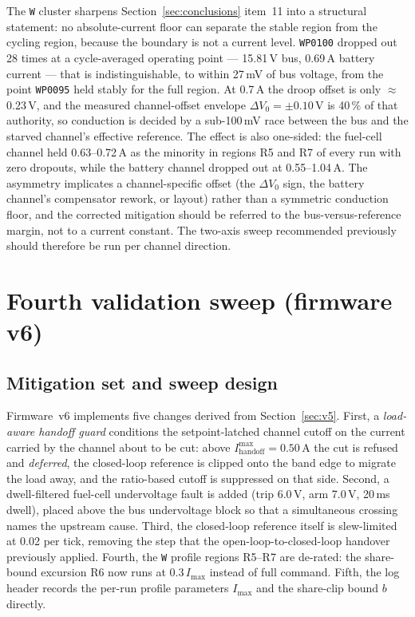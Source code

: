 \documentclass[11pt]{article}
\newcommand{\code}[1]{\texttt{#1}}
\begin{document}
The \code{W} cluster sharpens Section~\ref{sec:conclusions} item~11 into a
structural statement: no absolute-current floor can separate the stable region
from the cycling region, because the boundary is not a current level.
\code{WP0100} dropped out 28 times at a cycle-averaged operating point ---
15.81\,V bus, 0.69\,A battery current --- that is indistinguishable, to within
27\,mV of bus voltage, from the point \code{WP0095} held stably for the full
region. At 0.7\,A the droop offset is only $\approx$0.23\,V, and the measured
channel-offset envelope $\Delta V_0 = \pm0.10$\,V is 40\,\% of that authority,
so conduction is decided by a sub-100\,mV race between the bus and the starved
channel's effective reference. The effect is also one-sided: the fuel-cell
channel held 0.63--0.72\,A as the minority in regions R5 and R7 of every run
with zero dropouts, while the battery channel dropped out at 0.55--1.04\,A.
The asymmetry implicates a channel-specific offset (the $\Delta V_0$ sign, the
battery channel's compensator rework, or layout) rather than a symmetric
conduction floor, and the corrected mitigation should be referred to the
bus-versus-reference margin, not to a current constant. The two-axis sweep
recommended previously should therefore be run per channel direction.

\section{Fourth validation sweep (firmware v6)}
\label{sec:v6}

\subsection{Mitigation set and sweep design}

Firmware~v6 implements five changes derived from Section~\ref{sec:v5}. First, a
\emph{load-aware handoff guard} conditions the setpoint-latched channel cutoff on
the current carried by the channel about to be cut: above
$I_\mathrm{handoff}^{\max}=0.50$\,A the cut is refused and \emph{deferred}, the
closed-loop reference is clipped onto the band edge to migrate the load away, and
the ratio-based cutoff is suppressed on that side. Second, a dwell-filtered
fuel-cell undervoltage fault is added (trip 6.0\,V, arm 7.0\,V, 20\,ms dwell),
placed above the bus undervoltage block so that a simultaneous crossing names the
upstream cause. Third, the closed-loop reference itself is slew-limited at
0.02 per tick, removing the step that the open-loop-to-closed-loop handover
previously applied. Fourth, the \code{W} profile regions R5--R7 are de-rated: the
share-bound excursion R6 now runs at $0.3\,I_\mathrm{max}$ instead of full
command. Fifth, the log header records the per-run profile parameters
$I_\mathrm{max}$ and the share-clip bound $b$ directly.
\end{document}
